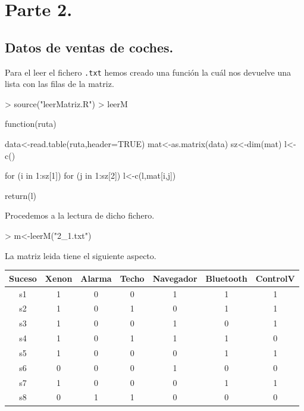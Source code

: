 \documentclass [a4paper] {article}
\begin{document}
{\bigskip
\section{Parte 2.}
\subsection{Datos de ventas de coches.}
Para el leer el fichero \texttt{.txt} hemos creado una función la cuál nos devuelve una lista con las filas
de la matriz.
\begin{Schunk}
\begin{Sinput}
> source("leerMatriz.R")
> leerM
\end{Sinput}
\begin{Soutput}
function(ruta) {

    data<-read.table(ruta,header=TRUE)
    mat<-as.matrix(data)
    sz<-dim(mat)
    l<-c()

    for (i in 1:sz[1]) {
        for (j in 1:sz[2]){
            l<-c(l,mat[i,j])
        }
    }

    return(l)
}
\end{Soutput}
\end{Schunk}

Procedemos a la lectura de dicho fichero.
\begin{Schunk}
\begin{Sinput}
> m<-leerM("2_1.txt")
\end{Sinput}
\end{Schunk}

\bigskip
La matriz leida tiene el siguiente aspecto.
\begin{table}[H]
\begin{center}
\begin{tabular}{|c|c|c|c|c|c|c|}
\hline
Suceso & Xenon & Alarma & Techo & Navegador & Bluetooth & ControlV \\
\hline \hline
s1 & 1 & 0 & 0 & 1 & 1 & 1 \\ \hline
s2 & 1 & 0 & 1 & 0 & 1 & 1 \\ \hline
s3 & 1 & 0 & 0 & 1 & 0 & 1 \\ \hline
s4 & 1 & 0 & 1 & 1 & 1 & 0 \\ \hline
s5 & 1 & 0 & 0 & 0 & 1 & 1 \\ \hline
s6 & 0 & 0 & 0 & 1 & 0 & 0 \\ \hline
s7 & 1 & 0 & 0 & 0 & 1 & 1 \\ \hline
s8 & 0 & 1 & 1 & 0 & 0 & 0 \\ \hline
\end{tabular}
\end{center}
\end{table}

}
\end{document}
